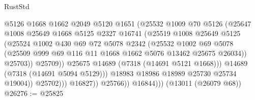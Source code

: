 \begin{lexlean}{RustStd}
\begin{coremodule}
                                @5126
                                @1668
                                @1662
                                @2049
                                @5120
                                @1651
                                (@25532
                                  @1009
                                  @70
                                  @5126
                                  (@25647
                                    @1008
                                    @25649
                                    @1668
                                    @5125
                                    @2327
                                    @16741
                                    (@25519
                                      @1008
                                      @25649
                                      @5125
                                      (@25524
                                        @1002
                                        @430
                                        @69
                                        @72
                                        @5078
                                        @2342
                                        (@25532
                                          @1002
                                          @69
                                          @5078
                                          (@25509
                                            @999
                                            @69
                                            @116
                                            @11
                                            @1668
                                            @1662
                                            @5076
                                            @13462
                                            @25675
                                            @26034))
                                        @25703))
                                    @25709))
                                @25675
                                @14689
                                (@7318 (@14691 @5121 @1668)))
                              @14689
                              (@7318 (@14691 @5094 @5129)))
                            @18983
                            @18986
                            @18989
                            @25730
                            @25734
                            @19004))
                        @25702)))
                  @16827))
              @25766))
          @16844)))
    (@13011 (@26079 @68))
@26276 := @25825

\end{coremodule}
\end{lexlean}
